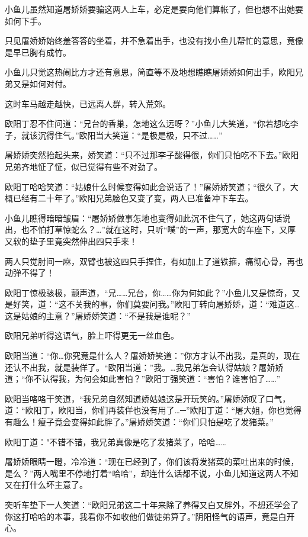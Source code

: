 \documentclass[12pt,oneside]{book}
\begin{document}
小鱼儿虽然知道屠娇娇要骗这两人上车，必定是要向他们算帐了，但也想不出她要如何下手。

只见屠娇娇始终羞答答的坐着，并不急着出手，也没有找小鱼儿帮忙的意思，竟像是早已胸有成竹。

小鱼儿只觉这热闹比方才还有意思，简直等不及地想瞧瞧屠娇娇如何出手，欧阳兄弟又是如何对付。

这时车马越走越快，已远离人群，转入荒郊。

欧阳丁忍不住问道：``兄台的香巢，怎地这么远呀？''小鱼儿大笑道，``你若想吃李子，就该沉得住气。''欧阳当大笑道：``是极是极，只不过\ldots\ldots{}''

屠娇娇突然抬起头来，娇笑道：``只不过那李子酸得很，你们只怕吃不下去。''欧阳兄弟齐地怔了怔，似已觉得有些不对劲了。

欧阳丁哈哈笑道：``姑娘什么时候变得如此会说话了！''屠娇娇笑道；``很久了，大概已经有二十年了。''欧阳兄弟脸色又变了变，两人已准备冲下车去。

小鱼儿瞧得暗暗皱眉：``屠娇娇做事怎地也变得如此沉不住气了，她这两句话说出，也不怕打草惊蛇么？\ldots{}''就在这时，只听``噗''的一声，那宽大的车座下，又厚又软的垫子里竟突然伸出四只手来！

两人只觉肘间一麻，双臂也被这四只手捏住，有如加上了道铁箍，痛彻心骨，再也动弹不得了！

欧阳丁惊极骇极，颤声道，``兄\ldots\ldots 兄台，你\ldots\ldots 你为何如此？''小鱼儿又是惊奇，又是好笑，道：``这不关我的事，你们莫要问我。''欧阳丁转向屠娇娇，道：``难道这\ldots 这是姑娘的主意？''屠娇娇笑道：``不是我是谁呢？''

欧阳兄弟听得这语气，脸上吓得更无一丝血色。

欧阳当道：``你\ldots 你究竟是什么人？屠娇娇笑道：''你方才认不出我，是真的，现在还认不出我，就是装佯了。``欧阳当道：''我。\ldots 我兄弟怎会认得姑娘？屠娇娇道；``你不认得我，为何会如此害怕？''欧阳丁强笑道：``害怕？谁害怕了\ldots\ldots{}''

欧阳当咯咯干笑道，``我兄弟自然知道娇姑娘这是开玩笑的。''屠娇娇叹了口气，道：``欧阳丁，欧阳当，你们再装佯也没有用了\ldots─''欧阳丁道：``屠大姐，你也觉得有趣么！瘦子竟会变得如此胖了。''屠娇娇笑道：``你们只怕是吃了发猪菜。''

欧阳丁道："不错不错，我兄弟真像是吃了发猪莱了，哈哈\ldots\ldots{}

屠娇娇眼睛一瞪，冷冷道：``现在已经到了，你们该将发猪菜的菜吐出来的时候，是么？''两人嘴里不停地打着``哈哈''，却连什么话都不说，小鱼儿知道这两人不知又在打什么坏主意了。

突听车垫下一人笑道：``欧阳兄弟这二十年来除了养得又白又胖外，不想还学会了你这打哈哈的本事，我看你不如收他们做徒弟算了。''阴阳怪气的语声，竟是白开心。
\end{document}
